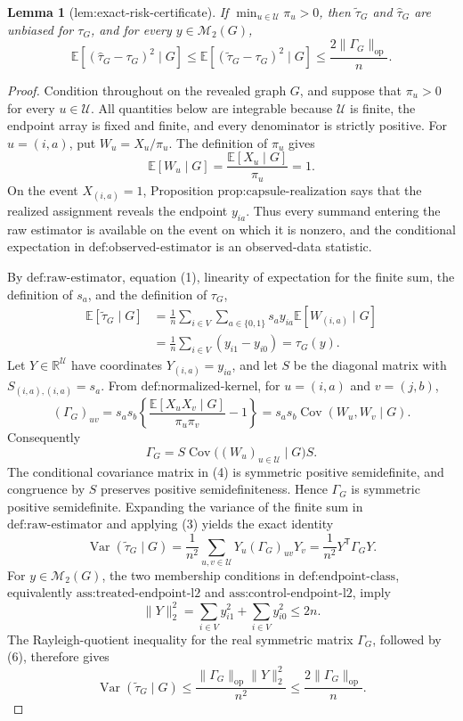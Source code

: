 \documentclass{article}
\newtheorem{lemma}{Lemma}
\begin{document}
\begin{lemma}[lem:exact-risk-certificate]\label{lem:exact-risk-certificate}
If \(\min_{u\in\mathcal U}\pi_u>0\), then \(\widetilde\tau_G\) and \(\widehat\tau_G\) are unbiased for \(\tau_G\), and for every \(y\in\mathcal M_2(G)\), \[\mathbb E[(\widehat\tau_G-\tau_G)^2\mid G]\le\mathbb E[(\widetilde\tau_G-\tau_G)^2\mid G]\le\frac{2\|\Gamma_G\|_{\mathrm{op}}}{n}.\]
\end{lemma}
\begin{proof}
Condition throughout on the revealed graph \(G\), and suppose that \(\pi_u>0\) for every \(u\in\mathcal U\).  All quantities below are integrable because \(\mathcal U\) is finite, the endpoint array is fixed and finite, and every denominator is strictly positive.  For \(u=(i,a)\), put \(W_u=X_u/\pi_u\).  The definition of \(\pi_u\) gives
\[
 \mathbb E[W_u\mid G]
 =\frac{\mathbb E[X_u\mid G]}{\pi_u}=1. \tag{1}
\]
On the event \(X_{(i,a)}=1\), Proposition \(\text{prop:capsule-realization}\) says that the realized assignment reveals the endpoint \(y_{ia}\).  Thus every summand entering the raw estimator is available on the event on which it is nonzero, and the conditional expectation in \(\text{def:observed-estimator}\) is an observed-data statistic.

By \(\text{def:raw-estimator}\), equation (1), linearity of expectation for the finite sum, the definition of \(s_a\), and the definition of \(\tau_G\),
\[
\begin{aligned}
 \mathbb E[\widetilde\tau_G\mid G]
 &=\frac1n\sum_{i\in V}\sum_{a\in\{0,1\}}
       s_a y_{ia}\mathbb E[W_{(i,a)}\mid G]\\
 &=\frac1n\sum_{i\in V}(y_{i1}-y_{i0})
 =\tau_G(y). \tag{2}
\end{aligned}
\]
Let \(Y\in\mathbb R^{\mathcal U}\) have coordinates \(Y_{(i,a)}=y_{ia}\), and let \(S\) be the diagonal matrix with \(S_{(i,a),(i,a)}=s_a\).  From \(\text{def:normalized-kernel}\), for \(u=(i,a)\) and \(v=(j,b)\),
\[
 (\Gamma_G)_{uv}
 =s_as_b\left\{
 \frac{\mathbb E[X_uX_v\mid G]}{\pi_u\pi_v}-1
 \right\}
 =s_as_b\operatorname{Cov}(W_u,W_v\mid G). \tag{3}
\]
Consequently
\[
 \Gamma_G=S\operatorname{Cov}\bigl((W_u)_{u\in\mathcal U}\mid G\bigr)S. \tag{4}
\]
The conditional covariance matrix in (4) is symmetric positive semidefinite, and congruence by \(S\) preserves positive semidefiniteness.  Hence \(\Gamma_G\) is symmetric positive semidefinite.  Expanding the variance of the finite sum in \(\text{def:raw-estimator}\) and applying (3) yields the exact identity
\[
 \operatorname{Var}(\widetilde\tau_G\mid G)
 =\frac1{n^2}\sum_{u,v\in\mathcal U}Y_u(\Gamma_G)_{uv}Y_v
 =\frac1{n^2}Y^{\mathsf T}\Gamma_GY. \tag{5}
\]
For \(y\in\mathcal M_2(G)\), the two membership conditions in \(\text{def:endpoint-class}\), equivalently \(\text{ass:treated-endpoint-l2}\) and \(\text{ass:control-endpoint-l2}\), imply
\[
 \lVert Y\rVert_2^2
 =\sum_{i\in V}y_{i1}^2+\sum_{i\in V}y_{i0}^2
 \le 2n. \tag{6}
\]
The Rayleigh-quotient inequality for the real symmetric matrix \(\Gamma_G\), followed by (6), therefore gives
\[
 \operatorname{Var}(\widetilde\tau_G\mid G)
 \le \frac{\lVert\Gamma_G\rVert_{\mathrm{op}}\lVert Y\rVert_2^2}{n^2}
 \le \frac{2\lVert\Gamma_G\rVert_{\mathrm{op}}}{n}. \tag{7}
\]


\end{proof}
\end{document}
